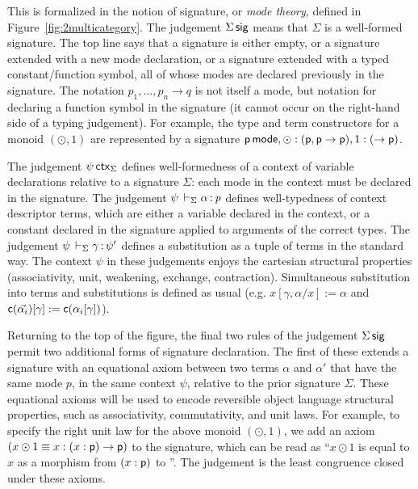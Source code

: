 This is formalized in the notion of signature, or \emph{mode theory},
defined in Figure~\ref{fig:2multicategory}.  The judgement $\Sigma \, \mathsf{sig}$ means that $\Sigma$ is a well-formed signature.  The top line
says that a signature is either empty, or a signature extended with a
new mode declaration, or a signature extended with a typed
constant/function symbol, all of whose modes are declared previously in
the signature.  The notation $p_1,\ldots,p_n \to q$ is not itself a
mode, but notation for declaring a function symbol in the signature (it
cannot occur on the right-hand side of a typing judgement).  For
example, the type and term constructors for a monoid $(\odot,1)$ are
represented by a signature $\mathsf{p} \, \mathsf{mode}, \mathsf{\odot} :
(\mathsf{p},\mathsf{p} \to \mathsf{p}), 1 : (\to \mathsf{p})$.

{
The judgement $\psi \, \mathsf{ctx}_\Sigma$ defines well-formedness of a
context of variable declarations relative to a signature $\Sigma$: each
mode in the context must be declared in the signature.}  The judgement
$\psi \,\vdash_{\Sigma} \mathit{\alpha} \, \mathit{:} \, \mathit{p}$ defines well-typedness of context
descriptor terms, which are either a variable declared in the context,
or a constant declared in the signature applied to arguments of the
correct types.  The judgement $\psi \,\vdash_{\Sigma} \mathit{\gamma} \, \mathit{:} \, \mathit{\psi'}$
defines a substitution as a tuple of terms in the standard way.  The
context $\psi$ in these judgements enjoys the cartesian structural
properties (associativity, unit, weakening, exchange, contraction).
Simultaneous substitution into terms and substitutions is defined as
usual (e.g.  $x[\gamma,\alpha/x] := \alpha$ and
$\mathsf{c}(\vec{\alpha_i})[\gamma] := \mathsf{c}(\alpha_i[\gamma])$).

Returning to the top of the figure, the final two rules of the judgement
$\Sigma \, \mathsf{sig}$ permit two additional forms of signature declaration.
The first of these extends a signature with an equational axiom between
two terms $\alpha$ and $\alpha'$ that have the same mode $p$, in the
same context $\psi$, relative to the prior signature $\Sigma$.  These
equational axioms will be used to encode reversible object language
structural properties, such as associativity, commutativity, and unit
laws.  For example, to specify the right unit law for the above monoid
$(\odot,1)$, we add an axiom $(x \odot 1 \equiv x : (x : \mathsf{p}) \to
\mathsf{p})$ to the signature, which can be read as ``$x \odot 1$ is equal
to $x$ as a morphism from $(x : \mathsf{p})$ to ''.  The judgement
 is the least congruence
closed under these axioms.

